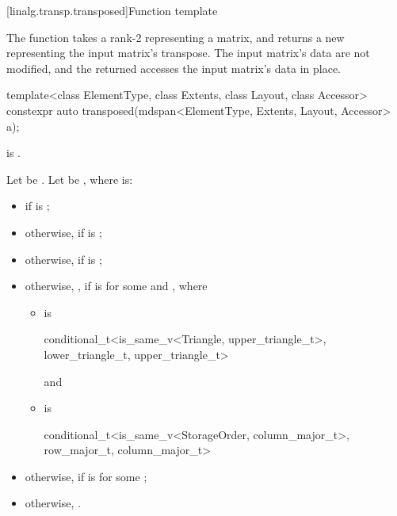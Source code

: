 [linalg.transp.transposed]{Function template }

\pnum
The  function
takes a rank-2  representing a matrix, and
returns a new  representing the input matrix's transpose.
The input matrix's data are not modified, and
the returned  accesses the input matrix's data in place.
%
\begin{itemdecl}
  template<class ElementType, class Extents, class Layout, class Accessor>
    constexpr auto transposed(mdspan<ElementType, Extents, Layout, Accessor> a);
\end{itemdecl}

\begin{itemdescr}
\pnum
\mandates
{} is .

\pnum
Let  be
.
Let  be
,
where  is:
\begin{itemize}
\item
{} if  is ;
\item
otherwise,  if  is ;
\item
otherwise,  if  is ;
\item
otherwise,
,
if  is\newline
{}
for some  and , where
\begin{itemize}
\item
{} is
\begin{codeblock}
conditional_t<is_same_v<Triangle, upper_triangle_t>,
              lower_triangle_t, upper_triangle_t>
\end{codeblock}
and
\item
{} is
\begin{codeblock}
conditional_t<is_same_v<StorageOrder, column_major_t>, row_major_t, column_major_t>
\end{codeblock}
\end{itemize}
\item
otherwise, 
if  is 
for some ;
\item
otherwise, .
\end{itemize}


\end{itemdescr}
